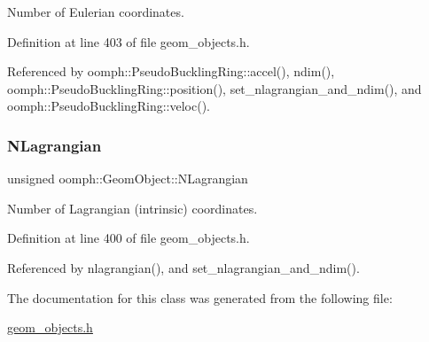 Number of Eulerian coordinates. 



Definition at line 403 of file geom\+\_\+objects.\+h.



Referenced by oomph\+::\+Pseudo\+Buckling\+Ring\+::accel(), ndim(), oomph\+::\+Pseudo\+Buckling\+Ring\+::position(), set\+\_\+nlagrangian\+\_\+and\+\_\+ndim(), and oomph\+::\+Pseudo\+Buckling\+Ring\+::veloc().

\mbox{\label{classoomph_1_1GeomObject_a11d8ac51be65ee822a6c782c5e079a2c}} 
\subsubsection{\texorpdfstring{N\+Lagrangian}{NLagrangian}}
{\footnotesize\ttfamily unsigned oomph\+::\+Geom\+Object\+::\+N\+Lagrangian\hspace{0.3cm}{\ttfamily [protected]}}



Number of Lagrangian (intrinsic) coordinates. 



Definition at line 400 of file geom\+\_\+objects.\+h.



Referenced by nlagrangian(), and set\+\_\+nlagrangian\+\_\+and\+\_\+ndim().



The documentation for this class was generated from the following file\+:\begin{DoxyCompactItemize}
\item 
\hyperlink{geom__objects_8h}{geom\+\_\+objects.\+h}\end{DoxyCompactItemize}
